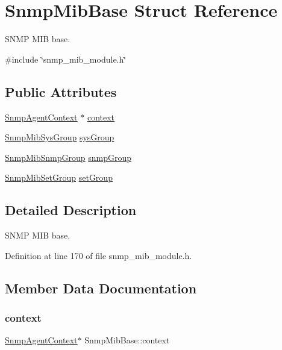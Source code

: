 \hypertarget{structSnmpMibBase}{}\section{Snmp\+Mib\+Base Struct Reference}
\label{structSnmpMibBase}


S\+N\+MP M\+IB base.  




{\ttfamily \#include \char`\"{}snmp\+\_\+mib\+\_\+module.\+h\char`\"{}}

\subsection*{Public Attributes}
\begin{DoxyCompactItemize}
\item 
\hyperlink{snmp__agent_8h_a4c68afef83114acf80065b64191bfdac}{Snmp\+Agent\+Context} $\ast$ \hyperlink{structSnmpMibBase_abd4c240f0312a23455c5367f561116fd}{context}
\item 
\hyperlink{structSnmpMibSysGroup}{Snmp\+Mib\+Sys\+Group} \hyperlink{structSnmpMibBase_a8b498a1a01d473f23df938241e56e71b}{sys\+Group}
\item 
\hyperlink{structSnmpMibSnmpGroup}{Snmp\+Mib\+Snmp\+Group} \hyperlink{structSnmpMibBase_a89b0e0c469a39dc7467e91e2276151b4}{snmp\+Group}
\item 
\hyperlink{structSnmpMibSetGroup}{Snmp\+Mib\+Set\+Group} \hyperlink{structSnmpMibBase_a8e53c5823bcff63d0ab2bab9c072d9f8}{set\+Group}
\end{DoxyCompactItemize}


\subsection{Detailed Description}
S\+N\+MP M\+IB base. 

Definition at line 170 of file snmp\+\_\+mib\+\_\+module.\+h.



\subsection{Member Data Documentation}
\mbox{\label{structSnmpMibBase_abd4c240f0312a23455c5367f561116fd}} 
\subsubsection{\texorpdfstring{context}{context}}
{\footnotesize\ttfamily \hyperlink{snmp__agent_8h_a4c68afef83114acf80065b64191bfdac}{Snmp\+Agent\+Context}$\ast$ Snmp\+Mib\+Base\+::context}



